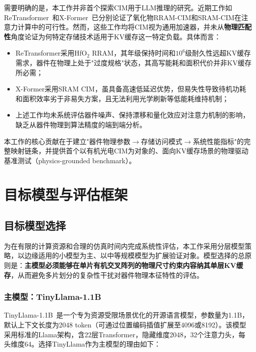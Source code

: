 需要明确的是，本工作并非首个探索CIM用于LLM推理的研究。近期工作如ReTransformer~\cite{huang2024retransformer}和X-Former~\cite{cho2024xformer}已分别论证了氧化物RRAM-CIM和SRAM-CIM在注意力计算中的可行性。然而，这些工作均将CIM视为通用加速器，并未从\textbf{物理匹配性}角度论证为何特定存储技术适用于KV缓存这一特定负载。具体而言：

\begin{itemize}
    \item ReTransformer采用HfO$_2$ RRAM，其年级保持时间和$10^6$级耐久性远超KV缓存需求，器件在物理上处于"过度规格"状态，其高写能耗和面积代价并非KV缓存所必需；
    \item X-Former采用SRAM CIM，虽具备高速低延迟优势，但易失性导致待机功耗和面积效率劣于非易失方案，且无法利用光学刷新等低能耗维持机制；
    \item 上述工作均未系统评估器件噪声、保持漂移和量化效应对注意力机制的影响，缺乏从器件物理到算法精度的端到端分析。
\end{itemize}

本工作的核心贡献在于建立"器件物理参数$\rightarrow$存储访问模式$\rightarrow$系统性能指标"的完整映射链条，并提供首个以有机光电CIM为对象的、面向KV缓存场景的物理驱动基准测试（physics-grounded benchmark）。


\section{目标模型与评估框架}
\label{sec:work2_models}

\subsection{目标模型选择}

为在有限的计算资源和合理的仿真时间内完成系统性评估，本工作采用分层模型策略，以边缘适用的小模型为主、以中等规模模型为扩展验证对象。模型选择的总原则是：\textbf{主模型必须能够在单片有机交叉阵列的物理尺寸约束内容纳其单层KV缓存}，从而避免多片划分的复杂性干扰对器件物理本征特性的评估。

\subsubsection{主模型：TinyLlama-1.1B}

TinyLlama-1.1B~\cite{zhang2024tinyllama}是一个专为资源受限场景优化的开源语言模型，参数量为1.1B，默认上下文长度为2048 token（可通过位置编码插值扩展至4096或8192）。该模型采用标准的Llama架构，含22层Transformer，隐藏维度2048，32个注意力头，每头维度64。选择TinyLlama作为主模型的理由如下：

